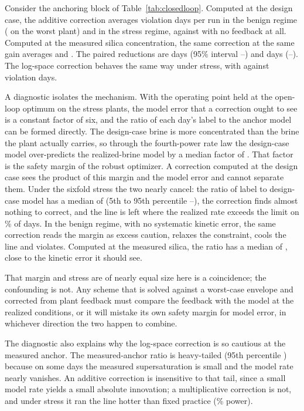 Consider the anchoring block of Table~\ref{tab:closedloop}. Computed at
the design case, the additive correction averages 
violation days per run in the benign regime ( on the
worst plant) and  in the stress regime, against
 with no feedback at all. Computed at the measured silica
concentration, the same correction at the same gain averages
 and . The paired reductions are
 days (95\% interval
--) and 
days (--). The log-space
correction behaves the same way under stress, with 
against  violation days.

A diagnostic isolates the mechanism. With the operating point held at
the open-loop optimum on the  stress plants, the model
error that a correction ought to see is a constant factor of six, and
the ratio of each day's label to the anchor model can be formed
directly. The design-case brine is more concentrated than the brine the
plant actually carries, so through the fourth-power rate law the
design-case model over-predicts the realized-brine model by a median
factor of . That factor is the safety margin of the
robust optimizer. A correction computed at the design case sees the
product of this margin and the model error and cannot separate them.
Under the sixfold stress the two nearly cancel: the ratio of label to
design-case model has a median of  (5th to 95th
percentile --), the correction finds almost
nothing to correct, and the line is left where the realized rate
exceeds the limit on \% of days. In the benign regime,
with no systematic kinetic error, the same correction reads the margin
as excess caution, relaxes the constraint, cools the line and violates.
Computed at the measured silica, the ratio has a median of
, close to the kinetic error it should see.

That margin and stress are of nearly equal size here is a coincidence;
the confounding is not. Any scheme that is solved against a worst-case
envelope and corrected from plant feedback must compare the feedback
with the model at the realized conditions, or it will mistake its own
safety margin for model error, in whichever direction the two happen to
combine.

The diagnostic also explains why the log-space correction is so
cautious at the measured anchor. The measured-anchor ratio is
heavy-tailed (95th percentile ) because on some days the
measured supersaturation is small and the model rate nearly vanishes.
An additive correction is insensitive to that tail, since a small model
rate yields a small absolute innovation; a multiplicative correction is
not, and under stress it ran the line hotter than fixed practice
(\% power).

